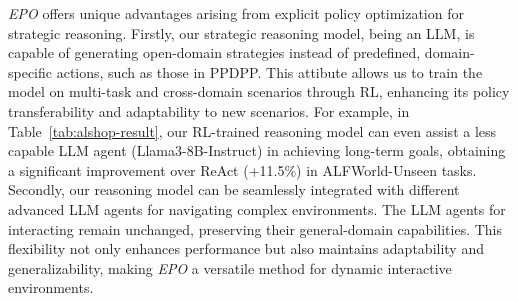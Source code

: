 \textit{EPO} offers unique advantages arising from explicit policy optimization for strategic reasoning. Firstly, our strategic reasoning model, being an LLM, is capable of generating open-domain strategies instead of predefined, domain-specific actions, such as those in PPDPP. This attibute allows us to train the model on multi-task and cross-domain scenarios through RL, enhancing its policy transferability and adaptability to new scenarios. For example, in Table~\ref{tab:alshop-result}, our RL-trained reasoning model can even assist a less capable LLM agent (Llama3-8B-Instruct) in achieving long-term goals, obtaining a significant improvement over ReAct (+11.5\%) in ALFWorld-Unseen tasks.
Secondly, our reasoning model can be seamlessly integrated with different advanced LLM agents for navigating complex environments. The LLM agents for interacting remain unchanged, preserving their general-domain capabilities. This flexibility not only enhances performance but also maintains adaptability and generalizability, making \textit{EPO} a versatile method for dynamic interactive environments.




